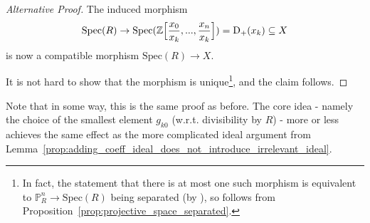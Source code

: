 \documentclass{scrartcl}
\newcommand{\Z}{\mathbb{Z}}
\newcommand{\D}[1]{\mathrm{D}_+(#1)}
\renewcommand{\P}{\mathbb{P}}
\newcommand{\Spec}{\mathrm{Spec}}
\newcommand{\citestacks}[1]{\cite[\href{https://stacks.math.columbia.edu/tag/#1}{Tag #1}]{stacks}}
\theoremstyle{definition}
\begin{document}
\begin{proof}[Alternative Proof]
    The induced morphism
    \begin{equation*}
        \Spec(R) \to \Spec(\Z\Bigl[ \frac {x_0} {x_k}, ..., \frac {x_n} {x_k} \Bigr]) = \D{x_k} \subseteq X
    \end{equation*}
    is now a compatible morphism $\Spec(R) \to X$.
    
    It is not hard to show that the morphism is unique\footnote{In fact, the statement that there is at most one such morphism is equivalent to $\P_R^n \to \Spec(R)$ being separated (by \citestacks{01L0}), so follows from Proposition~\ref{prop:projective_space_separated}.}, and the claim follows.
\end{proof}
Note that in some way, this is the same proof as before.
The core idea - namely the choice of the smallest element $g_{k0}$ (w.r.t. divisibility by $R$) - more or less achieves the same effect as the more complicated ideal argument from Lemma~\ref{prop:adding_coeff_ideal_does_not_introduce_irrelevant_ideal}.
\printbibliography
\end{document}
